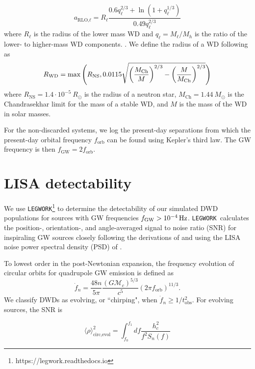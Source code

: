 \documentclass[twocolumn, linenumbers]{aastex631}
\newcommand{\legwork}{\texttt{LEGWORK}}
\begin{document}
\begin{equation}
    a_{\text{RLO,}\ell} = R_{\ell} \frac{0.6 q_{\ell}^{2/3} + 
\ln{(1+q_{\ell}^{1/3})}}{0.49 q_{\ell}^{2/3}}
\end{equation}
where $R_{\ell}$ is the radius of the lower mass WD and $q_{\ell} = 
M_{\ell}/M_{h}$ is the ratio of the lower- to higher-mass WD components. 
\citep{Eggleton1983}. 
We define the radius of a WD following \citet{Tout1997, Hurley2000} as
\begin{equation}
    R_{\rm{WD}} = \max\Bigg(R_\text{NS}, 
0.0115\sqrt{\left(\frac{M_\text{Ch}}{M}\right)^{2/3}-\left(\frac{M}{M_\text{Ch}}\right)^{2/3}} 
\Bigg) 
\end{equation}
\noindent where $R_\text{NS} = 1.4\cdot 10^{-5}~R_\odot$ is the radius of 
a neutron star, $M_{\text{Ch}}=1.44 ~M_\odot$ is the Chandrasekhar limit 
for the mass of a stable WD, and $M$ is the mass of the WD in solar 
masses. 

For the non-discarded systems, we log the present-day separations from 
which the present-day orbital frequency $f_\text{orb}$ can be found using 
Kepler's third law. The GW frequency is then $f_\text{GW} = 
2f_\text{orb}$.


\section{LISA detectability}
\label{sec:LISA_obs}
We use \legwork\footnote{https://legwork.readthedocs.io} \citep{Wagg2021} 
to determine the detectability of our simulated DWD populations for 
sources with GW frequencies $f_{\rm{GW}}>10^{-4}\,\rm{Hz}$. \legwork\ 
calculates the position-, orientation-, and angle-averaged signal to noise 
ratio (SNR) for inspiraling GW sources closely following the derivations 
of \citet{Flanagan1998} and using the LISA noise power spectral density 
(PSD) of \citet{Robson2019}. 

To lowest order in the post-Newtonian expansion, the frequency evolution 
of circular orbits for quadrupole GW emission is defined as
\begin{equation}
    \Dot{f}_n = \frac{48n}{5\pi} \frac{(G\mathcal{M}_c)^{5/3}}{c^5} (2\pi 
f_\text{orb})^{11/3}.
\end{equation}
We classify DWDs as evolving, or ``chirping", when $\Dot{f}_n \geq 
1/t_\text{obs}^2$. For evolving sources, the SNR is

\begin{equation}
   \langle \rho \rangle^2_{\text{circ,evol}} = \int_{f_0}^{f_1}df   
\frac{h_{c}^2}{f^2S_n(f)}
\end{equation}
\end{document}
